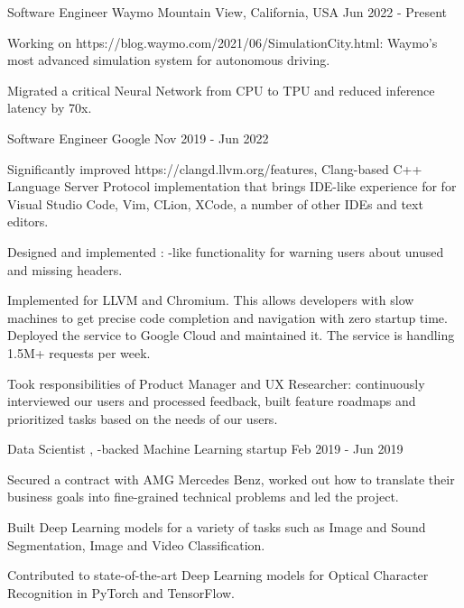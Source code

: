 
\begin{cventries}

  \cventry
    {Software Engineer}
    {Waymo}
    {Mountain View, California, USA}
    {Jun 2022 - Present}
    {
      \begin{cvitems}
        \item Working on 
	{https://blog.waymo.com/2021/06/SimulationCity.html}: Waymo's most
        advanced simulation system for autonomous driving.
        \item Migrated a critical Neural Network from CPU to TPU and
          reduced inference latency by 70x.
      \end{cvitems}
    }

  \cventry
    {Software Engineer}
    {Google}
    {}
    {Nov 2019 - Jun 2022}
    {
      \begin{cvitems}
        \item Significantly improved 
	  {https://clangd.llvm.org/features}, Clang-based C++ Language
	  Server Protocol implementation that brings IDE-like experience for
	  for Visual Studio Code, Vim, CLion, XCode, a number of
	  other IDEs and text editors.
        \item Designed and implemented : -like functionality for warning users about unused and
          missing headers.
        \item Implemented  for LLVM and Chromium. This
          allows developers with slow machines to get precise code completion
          and navigation with zero startup time. Deployed the service to Google
	  Cloud and maintained it. The service is handling 1.5M+ requests
          per week.
        \item Took responsibilities of Product Manager and UX Researcher:
          continuously interviewed our users and processed feedback, built
          feature roadmaps and prioritized tasks based on the needs of our
          users.
      \end{cvitems}
    }

  \cventry
    {Data Scientist}
    {,
     -backed Machine Learning
     startup}
    {}
    {Feb 2019 - Jun 2019}
    {
      \begin{cvitems}
        \item Secured a contract with AMG Mercedes Benz, worked out how to
          translate their business goals into fine-grained technical problems
          and led the project.
        \item Built Deep Learning models for a variety of tasks such as Image
	  and Sound Segmentation, Image and Video Classification.
        \item Contributed to state-of-the-art Deep Learning models for Optical
          Character Recognition in PyTorch and TensorFlow.
      \end{cvitems}
    }


\end{cventries}
